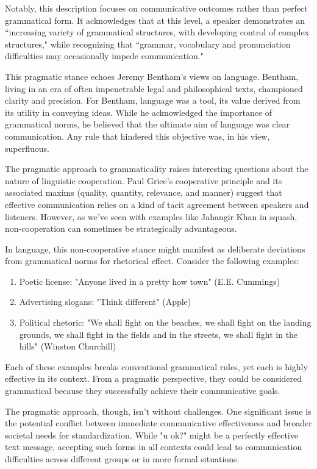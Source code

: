 Notably, this description focuses on communicative outcomes rather than perfect grammatical form. It acknowledges that at this level, a speaker demonstrates an ``increasing variety of grammatical structures, with developing control of complex structures," while recognizing that ``grammar, vocabulary and pronunciation difficulties may occasionally impede communication."

This pragmatic stance echoes Jeremy Bentham's views on language. Bentham, living in an era of often impenetrable legal and philosophical texts, championed clarity and precision. For Bentham, language was a tool, its value derived from its utility in conveying ideas. While he acknowledged the importance of grammatical norms, he believed that the ultimate aim of language was clear communication. Any rule that hindered this objective was, in his view, superfluous.

The pragmatic approach to grammaticality raises interesting questions about the nature of linguistic cooperation. Paul Grice's cooperative principle and its associated maxims (quality, quantity, relevance, and manner) suggest that effective communication relies on a kind of tacit agreement between speakers and listeners. However, as we've seen with examples like Jahangir Khan in squash, non-cooperation can sometimes be strategically advantageous.

In language, this non-cooperative stance might manifest as deliberate deviations from grammatical norms for rhetorical effect. Consider the following examples:

\begin{enumerate}
    \item Poetic license: "Anyone lived in a pretty how town" (E.E. Cummings)
    \item Advertising slogans: "Think different" (Apple)
    \item Political rhetoric: "We shall fight on the beaches, we shall fight on the landing grounds, we shall fight in the fields and in the streets, we shall fight in the hills" (Winston Churchill)
\end{enumerate}

Each of these examples breaks conventional grammatical rules, yet each is highly effective in its context. From a pragmatic perspective, they could be considered grammatical because they successfully achieve their communicative goals.

\bigskip


The pragmatic approach, though, isn't without challenges. One significant issue is the potential conflict between immediate communicative effectiveness and broader societal needs for standardization. While "u ok?" might be a perfectly effective text message, accepting such forms in all contexts could lead to communication difficulties across different groups or in more formal situations.

